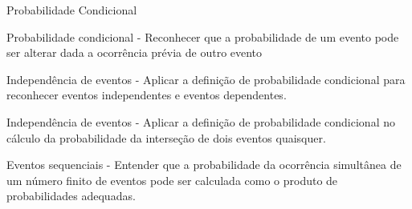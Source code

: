 \begin{paginatexto}{Probabilidade Condicional}
\begin{OES}
\item Probabilidade condicional - Reconhecer que a probabilidade de um evento pode ser alterar dada a ocorrência prévia de outro evento
\item Independência de eventos - Aplicar a definição de probabilidade condicional para reconhecer eventos independentes e eventos dependentes.
\item Independência de eventos - Aplicar a definição de probabilidade condicional no cálculo da probabilidade da interseção de dois eventos quaisquer.
\item Eventos sequenciais - Entender que a probabilidade da ocorrência simultânea de um número finito de eventos pode ser calculada como o produto de probabilidades adequadas.
\end{OES}
\end{paginatexto}


